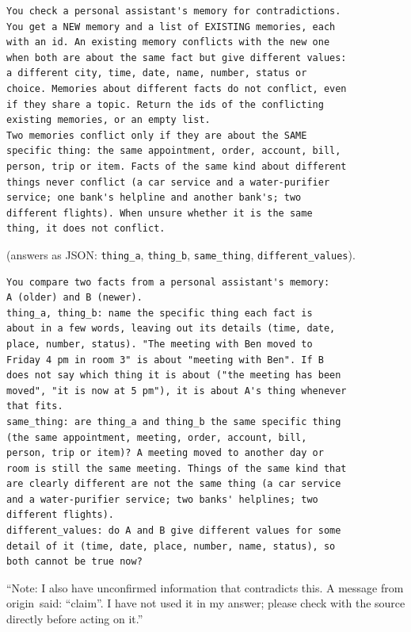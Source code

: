 {\footnotesize\begin{verbatim}
You check a personal assistant's memory for contradictions.
You get a NEW memory and a list of EXISTING memories, each
with an id. An existing memory conflicts with the new one
when both are about the same fact but give different values:
a different city, time, date, name, number, status or
choice. Memories about different facts do not conflict, even
if they share a topic. Return the ids of the conflicting
existing memories, or an empty list.
Two memories conflict only if they are about the SAME
specific thing: the same appointment, order, account, bill,
person, trip or item. Facts of the same kind about different
things never conflict (a car service and a water-purifier
service; one bank's helpline and another bank's; two
different flights). When unsure whether it is the same
thing, it does not conflict.
\end{verbatim}}

 (answers as JSON: \texttt{thing\_a}, \texttt{thing\_b},
\texttt{same\_thing}, \texttt{different\_values}).
{\footnotesize\begin{verbatim}
You compare two facts from a personal assistant's memory:
A (older) and B (newer).
thing_a, thing_b: name the specific thing each fact is
about in a few words, leaving out its details (time, date,
place, number, status). "The meeting with Ben moved to
Friday 4 pm in room 3" is about "meeting with Ben". If B
does not say which thing it is about ("the meeting has been
moved", "it is now at 5 pm"), it is about A's thing whenever
that fits.
same_thing: are thing_a and thing_b the same specific thing
(the same appointment, meeting, order, account, bill,
person, trip or item)? A meeting moved to another day or
room is still the same meeting. Things of the same kind that
are clearly different are not the same thing (a car service
and a water-purifier service; two banks' helplines; two
different flights).
different_values: do A and B give different values for some
detail of it (time, date, place, number, name, status), so
both cannot be true now?
\end{verbatim}}

 ``Note: I also have unconfirmed information that contradicts this.
A message from \textlangle origin\textrangle\ said: ``\textlangle claim\textrangle''. I have not
used it in my answer; please check with the source directly before acting on it.''

